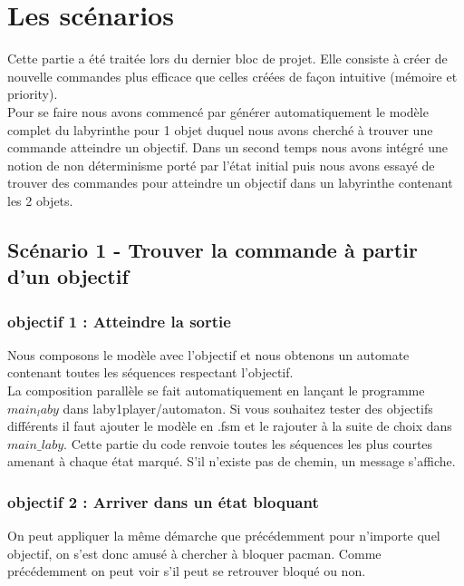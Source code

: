 \chapter{Les scénarios} \label{sec:sce}

Cette partie a été traitée lors du dernier bloc de projet. Elle consiste à créer de nouvelle commandes plus efficace que celles créées de façon intuitive  (mémoire et priority).\\
Pour se faire nous avons commencé par générer automatiquement le modèle complet du labyrinthe pour 1 objet duquel nous avons cherché à trouver une commande atteindre un objectif. Dans un second temps nous avons intégré une notion de non déterminisme porté par l'état initial puis nous avons essayé de trouver des commandes pour atteindre un objectif dans un labyrinthe contenant les 2 objets.


\section{Scénario 1 - Trouver la commande à partir d'un objectif}
\subsection{objectif 1 : Atteindre la sortie}
Nous composons le modèle avec l'objectif et nous obtenons un automate contenant toutes les séquences respectant l'objectif.\\
La composition parallèle se fait automatiquement en lançant le programme $main_laby$ dans laby1player/automaton. Si vous souhaitez tester des objectifs différents il faut ajouter le modèle en .fsm et le rajouter à la suite de choix dans $main\_laby$.
Cette partie du code renvoie toutes les séquences les plus courtes amenant à chaque état marqué. S'il n'existe pas de chemin, un message s'affiche.



\subsection{objectif 2 : Arriver dans un état bloquant}
On peut appliquer la même démarche que précédemment pour n'importe quel objectif, on s'est donc amusé à chercher à bloquer pacman. Comme précédemment on peut voir s'il peut se retrouver bloqué ou non.

